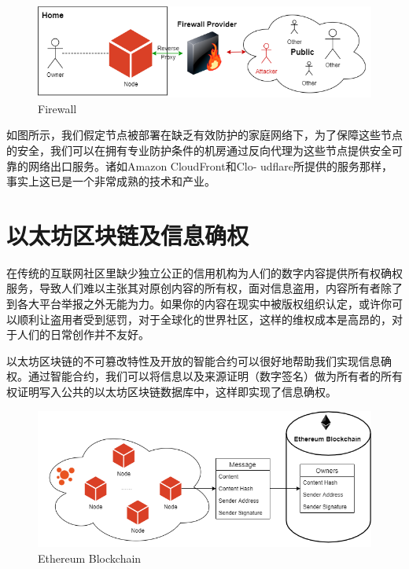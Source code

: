 \documentclass[12pt,a4paper]{extarticle}
\begin{document}
    \begin{figure}[H]
        \centering
        \includegraphics[width=\textwidth]{figures-firewall.png}
        \caption{Firewall}
    \end{figure}

    如图所示，我们假定节点被部署在缺乏有效防护的家庭网络下，为了保障这些节点的安全，我们可以在拥有专业防护条件的机房通过反向代理为这些节点提供安全可靠的网络出口服务。诸如Amazon CloudFront和Clo-
    udflare所提供的服务那样，事实上这已是一个非常成熟的技术和产业。
\section{以太坊区块链及信息确权}
    在传统的互联网社区里缺少独立公正的信用机构为人们的数字内容提供所有权确权服务，导致人们难以主张其对原创内容的所有权，面对信息盗用，内容所有者除了到各大平台举报之外无能为力。如果你的内容在现实中被版权组织认定，或许你可以顺利让盗用者受到惩罚，对于全球化的世界社区，这样的维权成本是高昂的，对于人们的日常创作并不友好。

    以太坊区块链的不可篡改特性及开放的智能合约可以很好地帮助我们实现信息确权。通过智能合约，我们可以将信息以及来源证明（数字签名）做为所有者的所有权证明写入公共的以太坊区块链数据库中，这样即实现了信息确权。


    \begin{figure}[H]
        \centering
        \includegraphics[width=\textwidth]{figures-blockchain.png}
        \caption{Ethereum Blockchain}
    \end{figure}
    
\end{document}
